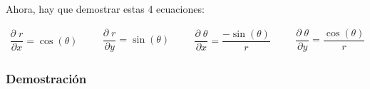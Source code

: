 \documentclass[12pt, fleqn]{report}                             %
\DeclareMathOperator \Space     {\quad}                         %
\theoremstyle{break}                                            %
\newcommand{\Wrap}[1]           {\left( #1 \right)}             %
\newcommand{\Cos}[1] {\cos\Wrap{#1}}                            %
\newcommand{\Sin}[1] {\sin\Wrap{#1}}                            %
\newcommand \Partial[2] {\dfrac{\partial \; #1}{\partial #2}}   %
\begin{document}
                \clearpage

                Ahora, hay que demostrar estas 4 ecuaciones:

                \begin{equation*}
                    \begin{split}
                        \Partial{r}{x} = \Cos{\theta}
                    \end{split}
                    \Space
                    \begin{split}
                        \Partial{r}{y} = \Sin{\theta}
                    \end{split}
                    \Space
                    \begin{split}
                        \Partial{\theta}{x} = \dfrac{-\Sin{\theta}}{r}
                    \end{split}
                    \Space
                    \begin{split}
                        \Partial{\theta}{y} = \dfrac{\Cos{\theta}}{r}
                    \end{split}
                \end{equation*}


                \subsubsection{Demostración}
\end{document}
